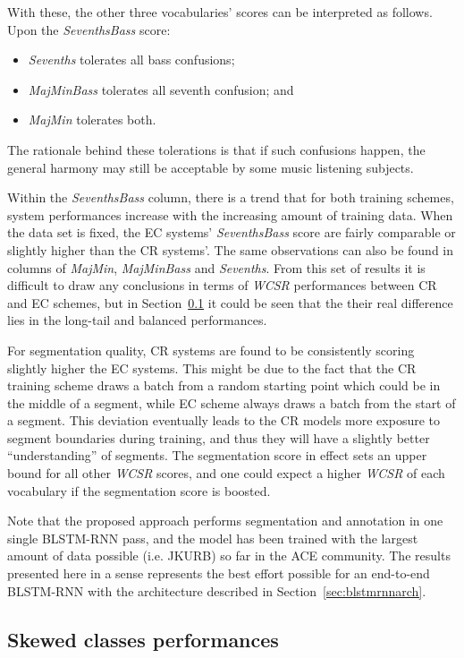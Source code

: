 With these, the other three vocabularies' scores can be interpreted as follows. Upon the \textit{SeventhsBass} score:
\begin{itemize}
	\item \textit{Sevenths} tolerates all bass confusions;
	\item \textit{MajMinBass} tolerates all seventh confusion; and
	\item \textit{MajMin} tolerates both.
\end{itemize}
The rationale behind these tolerations is that if such confusions happen, the general harmony may still be acceptable by some music listening subjects.

Within the \textit{SeventhsBass} column, there is a trend that for both training schemes, system performances increase with the increasing amount of training data. When the data set is fixed, the EC systems' \textit{SeventhsBass} score are fairly comparable or slightly higher than the CR systems'. The same observations can also be found in columns of \textit{MajMin}, \textit{MajMinBass} and \textit{Sevenths}. From this set of results it is difficult to draw any conclusions in terms of \textit{WCSR} performances between CR and EC schemes, but in Section~\ref{sec:4-scper} it could be seen that the their real difference lies in the long-tail and balanced performances.

For segmentation quality, CR systems are found to be consistently scoring slightly higher the EC systems. This might be due to the fact that the CR training scheme draws a batch from a random starting point which could be in the middle of a segment, while EC scheme always draws a batch from the start of a segment. This deviation eventually leads to the CR models more exposure to segment boundaries during training, and thus they will have a slightly better ``understanding'' of segments. The segmentation score in effect sets an upper bound for all other \textit{WCSR} scores, and one could expect a higher \textit{WCSR} of each vocabulary if the segmentation score is boosted.

Note that the proposed approach performs segmentation and annotation in one single BLSTM-RNN pass, and the model has been trained with the largest amount of data possible (i.e. JKURB) so far in the ACE community. The results presented here in a sense represents the best effort possible for an end-to-end BLSTM-RNN with the architecture described in Section~\ref{sec:blstmrnnarch}.

\subsection{Skewed classes performances} \label{sec:4-scper}

